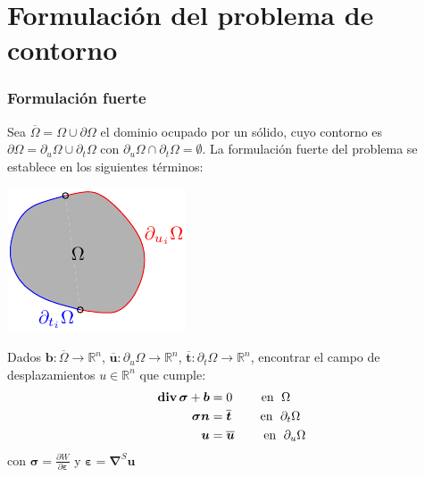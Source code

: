 \documentclass[handout]{beamer}
\newcommand{\diver}{\operatorname{{\bf div}}}
\begin{document}
\section{Formulación del problema de contorno}
\begin{frame}
\frametitle{Formulación fuerte}
\parbox{70mm}{
Sea $\overline{\Omega}=\Omega \cup \partial \Omega$ el dominio
ocupado por un sólido, cuyo contorno es $\partial \Omega=
\partial_u \Omega \cup \partial_t \Omega$ con
$\partial_u \Omega \cap \partial_t \Omega=\emptyset$. La
formulación fuerte del problema se establece en los siguientes términos:
}\parbox{60mm}{
\includegraphics{elas1}
}
Dados $\bm{b}:\overline{\Omega} \rightarrow \mathbb{R}^n$,
$\overline{\bm{u}}: \partial_u \Omega \rightarrow \mathbb{R}^n$,
$\overline{\bm{t}}: \partial_t \Omega \rightarrow \mathbb{R}^n$,
encontrar el campo de desplazamientos $u\in \mathbb{R}^n$ que cumple:
\begin{align}
\diver\bm{\sigma}+\bm{b}&=0  \qquad \textrm{ en }\;{\Omega} \label{eula11} \\
\bm{\sigma}\bm{n}&=\overline{\bm{t}} \qquad \textrm{ en }\;\partial_t \Omega \\
\bm{u}&=\overline{\bm{u}} \qquad \textrm{ en }\;\partial_u \Omega
\end{align}
con $\bm{\sigma}=\frac{\partial W}{\partial \bm \varepsilon}$ y
$\bm{\varepsilon}=\bm{\nabla}^{S}\bm{u}$
\end{frame}
\end{document}
